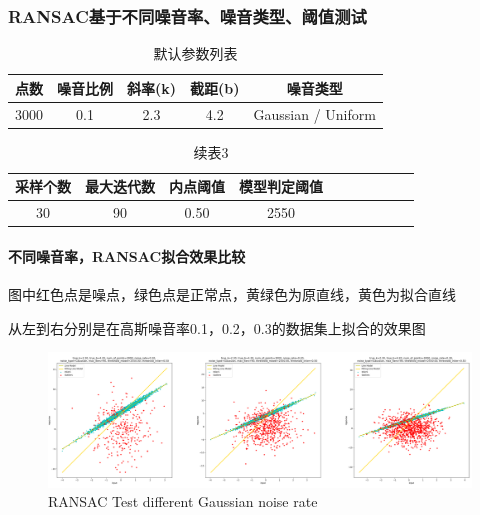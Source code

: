 \documentclass{seuer}
\begin{document}
\subsubsection{RANSAC基于不同噪音率、噪音类型、阈值测试}
\begin{table}[h]
  \centering
  \captionnamefont{\wuhao\bf\heiti}
  \captiontitlefont{\wuhao\bf\heiti}
  \caption{默认参数列表} \label{tab:eg1}
  \liuhao
  \begin{tabular}{ccccc}
  \toprule
  {点数} & {噪音比例} & {斜率(k)} & {截距(b)} & {噪音类型}\\
  \midrule 
  3000 & 0.1 & 2.3 & 4.2 & Gaussian / Uniform\\
  \bottomrule
  \end{tabular}
\end{table}
\begin{table}[h]
  \centering
  \captionnamefont{\wuhao\bf\heiti}
  \captiontitlefont{\wuhao\bf\heiti}
  \caption{续表3} \label{tab:eg1}
  \liuhao
  \begin{tabular}{cccccccccc}
  \toprule
  {采样个数} & {最大迭代数} & {内点阈值} & {模型判定阈值}\\
  \midrule 
  30 & 90 & 0.50 & 2550 \\
  \bottomrule
  \end{tabular}
\end{table}

\paragraph{不同噪音率，RANSAC拟合效果比较}
图中红色点是噪点，绿色点是正常点，黄绿色为原直线，黄色为拟合直线

从左到右分别是在高斯噪音率0.1，0.2，0.3的数据集上拟合的效果图
\begin{figure}[H]
  \centering
  \includegraphics[scale=0.1]{./image/test_noise_rate_Gaussian.png}
  \caption{RANSAC Test different Gaussian noise rate} \label{fig:eg}
\end{figure}
\end{document}
